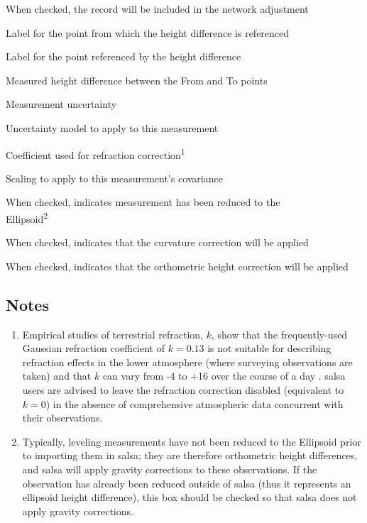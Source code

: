 \begin{description}[leftmargin=!,labelwidth=\widthof{\bfseries Refract Coeff:}]
\item[Enabled:] When checked, the record will be included in the network adjustment
\item[From:] Label for the point from which the height difference is referenced
\item[To:] Label for the point referenced by the height difference
\item[Height Diff:] Measured height difference between the From and To points
\item[Sigma:] Measurement uncertainty
\item[Uncertainty:] Uncertainty model to apply to this measurement
\item[Refract Coeff:] Coefficient used for refraction correction\textsuperscript{1}
\item[Scaling:] Scaling to apply to this measurement's covariance
\item[Reduced:] When checked, indicates measurement has been reduced to the \\Ellipsoid\textsuperscript{2}
\item[Curvature:] When checked, indicates that the curvature correction will be applied
\item[OHC:] When checked, indicates that the orthometric height correction will be applied
\end{description}

\subsection*{Notes}
\begin{enumerate}
\item Empirical studies of terrestrial refraction, $k$, show that the frequently-used Gaussian refraction coefficient of $k=0.13$ is not suitable for describing refraction effects in the lower atmosphere (where surveying observations are taken) and that $k$ can vary from -4 to +16 over the course of a day \cite{Hirt}.  \textsf{salsa} users are advised to leave the refraction correction disabled (equivalent to $k=0$) in the absence of comprehensive atmospheric data concurrent with their observations.
\item Typically, leveling measurements have not been reduced to the Ellipsoid prior to importing them in \textsf{salsa}; they are therefore orthometric height differences, and \textsf{salsa} will apply gravity corrections to these observations.  If the observation has already been reduced outside of \textsf{salsa} (thus it represents an ellipsoid height difference), this box should be checked so that \textsf{salsa} does not apply gravity corrections.
\end{enumerate}


